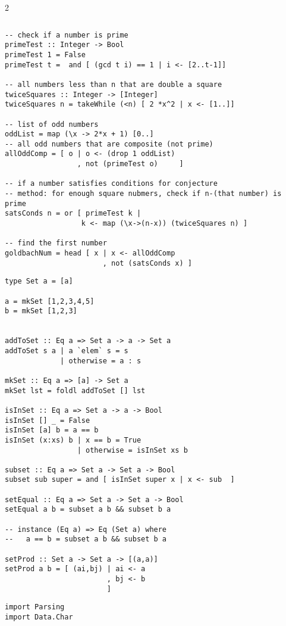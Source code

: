 \documentclass{article}
\def \columncount {2}
\begin{document}
\begin{multicols}{\columncount}
\begin{outline}[longenum]
\begin{verbatim}
\end{verbatim}

\begin{verbatim}
-- check if a number is prime
primeTest :: Integer -> Bool
primeTest 1 = False
primeTest t =  and [ (gcd t i) == 1 | i <- [2..t-1]]

-- all numbers less than n that are double a square
twiceSquares :: Integer -> [Integer]
twiceSquares n = takeWhile (<n) [ 2 *x^2 | x <- [1..]]

-- list of odd numbers
oddList = map (\x -> 2*x + 1) [0..]
-- all odd numbers that are composite (not prime)
allOddComp = [ o | o <- (drop 1 oddList)
                 , not (primeTest o)     ]

-- if a number satisfies conditions for conjecture
-- method: for enough square nubmers, check if n-(that number) is prime
satsConds n = or [ primeTest k | 
                  k <- map (\x->(n-x)) (twiceSquares n) ]

-- find the first number 
goldbachNum = head [ x | x <- allOddComp
                       , not (satsConds x) ]
\end{verbatim}


\begin{verbatim}
type Set a = [a]

a = mkSet [1,2,3,4,5]
b = mkSet [1,2,3]


addToSet :: Eq a => Set a -> a -> Set a
addToSet s a | a `elem` s = s
             | otherwise = a : s

mkSet :: Eq a => [a] -> Set a
mkSet lst = foldl addToSet [] lst

isInSet :: Eq a => Set a -> a -> Bool
isInSet [] _ = False
isInSet [a] b = a == b
isInSet (x:xs) b | x == b = True
                 | otherwise = isInSet xs b

subset :: Eq a => Set a -> Set a -> Bool
subset sub super = and [ isInSet super x | x <- sub  ]

setEqual :: Eq a => Set a -> Set a -> Bool
setEqual a b = subset a b && subset b a

-- instance (Eq a) => Eq (Set a) where
--   a == b = subset a b && subset b a

setProd :: Set a -> Set a -> [(a,a)]
setProd a b = [ (ai,bj) | ai <- a
                        , bj <- b
                        ]

\end{verbatim}


\begin{verbatim}
import Parsing
import Data.Char


\end{verbatim}
\end{outline}
\end{multicols}
\end{document}
